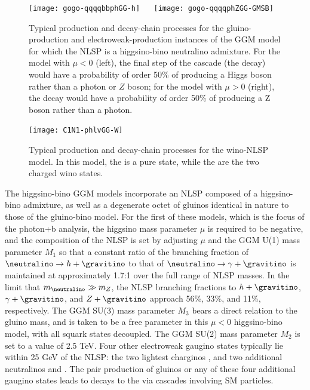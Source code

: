 \begin{figure}[tp]
  \begin{center}
    \texttt{[image: gogo-qqqqbbphGG-h]} ~~
    \texttt{[image: gogo-qqqqphZGG-GMSB]}
  \end{center}
  \caption{
    Typical production and decay-chain processes for the gluino-production
    and electroweak-production instances of the
    GGM model for which the NLSP is a higgsino-bino neutralino admixture.
    For the model with $\mu < 0$ (left), the final
    step of the cascade (the \neutralino decay) would have a
    probability of order 50\% of producing a Higgs boson rather than a
    photon or $Z$ boson; for the model
    with $\mu > 0$ (right), the \neutralino decay would have a
    probability of order 50\% of producing a Z boson rather than a photon.
    \label{fig:feynman_higgsino_bino}
  }
\end{figure}

\begin{figure}[tp]
  \begin{center}
    \texttt{[image: C1N1-phlvGG-W]}
  \end{center}
  \caption{
Typical production and decay-chain processes for the wino-NLSP model.
In this model, the \neutralino is a pure \winon state, while the
\chargino are the two charged wino states.
    \label{fig:feynman_wino}
  }
\end{figure}

The higgsino-bino GGM models incorporate an NLSP composed of
a higgsino-bino admixture, as well as
a degenerate octet of gluinos %
identical in nature to those of the
gluino-bino model. %
For the first %
of these models, which is the focus of the photon+b analysis,
the higgsino mass parameter $\mu$ is required to be negative, and the composition
of the NLSP is set by adjusting $\mu$ and the GGM U(1) mass parameter
$M_1$ so that a constant ratio of the branching fraction of $\neutralino \to h + \gravitino$
to that of $\neutralino \to \gamma + \gravitino$ is maintained at
approximately 1.7:1 over the full range of NLSP masses.
In the limit that $m_{\neutralino} \gg m_Z$, the NLSP
branching fractions to $h + \gravitino$, $\gamma + \gravitino$,
and $Z + \gravitino$ approach 56\%, 33\%, and 11\%, respectively.
The GGM SU(3) mass parameter $M_3$ bears a direct relation to the
gluino mass, and is taken to be a free parameter in this $\mu < 0$ higgsino-bino
model, with all squark states decoupled.
The GGM SU(2) mass parameter $M_2$ is set to a value of 2.5 TeV.
Four other electroweak gaugino states typically lie
within 25 GeV of the \neutralino NLSP: the two lightest charginos \chargino, and two
additional neutralinos \neutralinotwo and \neutralinothree.
The pair production of gluinos or any of these four additional gaugino
states leads to decays to the \neutralino via
cascades involving SM particles.

